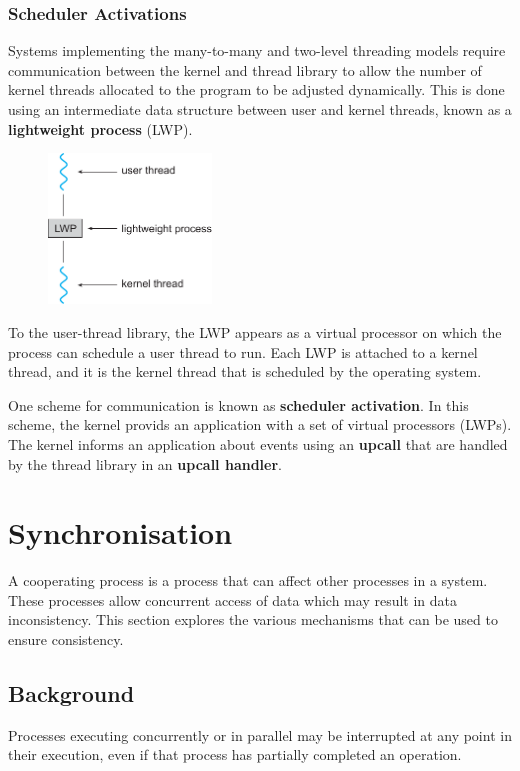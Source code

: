 \documentclass{article}
\begin{document}
\subsubsection{Scheduler Activations}
Systems implementing the many-to-many and two-level threading models
require communication between the kernel and thread library to allow
the number of kernel threads allocated to the program to be adjusted
dynamically. This is done using an intermediate data structure between
user and kernel threads, known as a \textbf{lightweight process} (LWP).
\begin{figure}[H]
    \centering
    \includegraphics[height = 4cm]{figures/lwp.pdf}
\end{figure}
To the user-thread library, the LWP appears as a virtual processor on
which the process can schedule a user thread to run. Each LWP is
attached to a kernel thread, and it is the kernel thread that is
scheduled by the operating system.

One scheme for communication is known as \textbf{scheduler activation}.
In this scheme, the kernel provids an application with a set of virtual
processors (LWPs). The kernel informs an application about events using
an \textbf{upcall} that are handled by the thread library in an
\textbf{upcall handler}.
\section{Synchronisation}
A cooperating process is a process that can affect other processes in a
system. These processes allow concurrent access of data which may
result in data inconsistency. This section explores the various
mechanisms that can be used to ensure consistency.
\subsection{Background}
Processes executing concurrently or in parallel may be interrupted at
any point in their execution, even if that process has partially
completed an operation.
\end{document}
